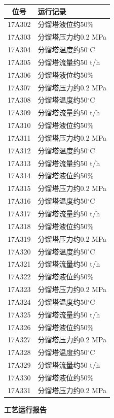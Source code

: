 \documentclass[UTF8,10pt,a4paper,fontset=fandol]{ctexart}
\begin{document}
\begin{center}
\begin{minipage}[t]{0.47\textwidth}
\begin{tabularx}{\linewidth}{|c|>{\RaggedRight\arraybackslash}X|}
\hline
\textbf{位号} & \textbf{运行记录} \\ \hline
17A302 & 分馏塔液位约50\% \\ \hline
17A303 & 分馏塔压力约0.2 MPa \\ \hline
17A304 & 分馏塔温度约50$^\circ$C \\ \hline
17A305 & 分馏塔流量约50 t/h \\ \hline
17A306 & 分馏塔液位约50\% \\ \hline
17A307 & 分馏塔压力约0.2 MPa \\ \hline
17A308 & 分馏塔温度约50$^\circ$C \\ \hline
17A309 & 分馏塔流量约50 t/h \\ \hline
17A310 & 分馏塔液位约50\% \\ \hline
17A311 & 分馏塔压力约0.2 MPa \\ \hline
17A312 & 分馏塔温度约50$^\circ$C \\ \hline
17A313 & 分馏塔流量约50 t/h \\ \hline
17A314 & 分馏塔液位约50\% \\ \hline
17A315 & 分馏塔压力约0.2 MPa \\ \hline
17A316 & 分馏塔温度约50$^\circ$C \\ \hline
17A317 & 分馏塔流量约50 t/h \\ \hline
17A318 & 分馏塔液位约50\% \\ \hline
17A319 & 分馏塔压力约0.2 MPa \\ \hline
17A320 & 分馏塔温度约50$^\circ$C \\ \hline
17A321 & 分馏塔流量约50 t/h \\ \hline
17A322 & 分馏塔液位约50\% \\ \hline
17A323 & 分馏塔压力约0.2 MPa \\ \hline
17A324 & 分馏塔温度约50$^\circ$C \\ \hline
17A325 & 分馏塔流量约50 t/h \\ \hline
17A326 & 分馏塔液位约50\% \\ \hline
17A327 & 分馏塔压力约0.2 MPa \\ \hline
17A328 & 分馏塔温度约50$^\circ$C \\ \hline
17A329 & 分馏塔流量约50 t/h \\ \hline
17A330 & 分馏塔液位约50\% \\ \hline
17A331 & 分馏塔压力约0.2 MPa \\ \hline
\end{tabularx}
\end{minipage}
\hfill
\begin{minipage}[t]{0.47\textwidth}
\centering
\textbf{工艺运行报告}


\end{minipage}
\end{center}
\end{document}
